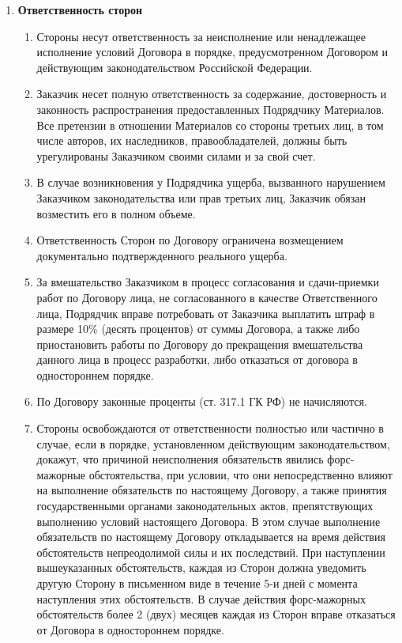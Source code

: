 \documentclass[14pt,a4paper]{article}
\begin{document}
\begin{enumerate}
	\item
	\begin{center}
	\textbf{Ответственность сторон}
	\end{center}
	\begin{enumerate}
		\item Стороны несут ответственность за неисполнение или ненадлежащее исполнение условий Договора в порядке, предусмотренном Договором и действующим законодательством Российской Федерации.

		\item Заказчик несет полную ответственность за содержание, достоверность и законность распространения предоставленных Подрядчику Материалов. Все претензии в отношении Материалов со стороны третьих лиц, в том числе авторов, их наследников, правообладателей, должны быть урегулированы Заказчиком своими силами и за свой счет.

		\item В случае возникновения у Подрядчика ущерба, вызванного нарушением Заказчиком законодательства или прав третьих лиц, Заказчик обязан возместить его в полном объеме.

		\item Ответственность Сторон по Договору ограничена возмещением документально подтвержденного реального ущерба.

		\item За вмешательство Заказчиком в процесс согласования и сдачи-приемки работ по Договору лица, не согласованного в качестве Ответственного лица, Подрядчик вправе потребовать от Заказчика выплатить штраф в размере 10\% (десять процентов) от суммы Договора, а также либо приостановить работы по Договору до прекращения вмешательства данного лица в процесс разработки, либо отказаться от договора в одностороннем порядке.

		\item По Договору законные проценты (ст. 317.1 ГК РФ) не начисляются.

		\item Стороны освобождаются от ответственности полностью или частично в случае, если в порядке, установленном действующим законодательством, докажут, что причиной неисполнения обязательств явились форс-мажорные обстоятельства, при условии, что они непосредственно влияют на выполнение обязательств по настоящему Договору, а также принятия государственными органами законодательных актов, препятствующих выполнению условий настоящего Договора. В этом случае выполнение обязательств по настоящему Договору откладывается на время действия обстоятельств непреодолимой силы и их
		последствий. При наступлении вышеуказанных обстоятельств, каждая из Сторон должна уведомить другую Сторону в письменном виде в течение 5-и дней с момента наступления этих обстоятельств. В случае действия форс-мажорных обстоятельств более 2 (двух) месяцев каждая из Сторон вправе отказаться от Договора в одностороннем порядке.
	\end{enumerate}


\end{enumerate}
\end{document}
